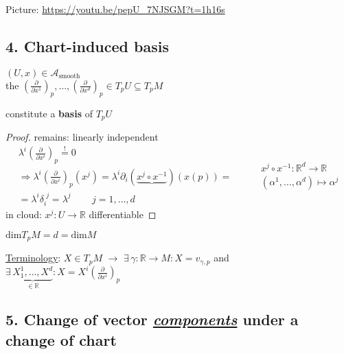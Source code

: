 Picture: \url{https://youtu.be/pepU_7NJSGM?t=1h16s}

\subsection{4. Chart-induced basis}

\begin{definition}
  $(U,x) \in \mathcal{A}_{\text{smooth}}$ \\
the $\left( \frac{ \partial }{ \partial x^1} \right)_p , \dots , \left( \frac{ \partial }{ \partial x^d} \right)_p \in T_pU \subseteq T_pM$

constitute a \textbf{basis} of $T_pU$

\end{definition}

\begin{proof} remains: linearly independent 
  \[
\begin{gathered}
\lambda^i \left( \frac{ \partial }{ \partial x^i} \right)_p \overset{!}{=} 0  \\
 \Longrightarrow \lambda^i \left( \frac{ \partial }{ \partial x^i} \right)_p(x^j) = \lambda^i \partial_i (\underbrace{ x^j \circ x^{-1} }_{} )( x(p)) = \\
 = \lambda^i \delta_i^{\,\,j} = \lambda^j \quad \quad \, j = 1 , \dots , d
\end{gathered} \quad \quad \, \begin{gathered}
  x^j \circ x^{-1} : \mathbb{R}^d \to \mathbb{R} \\
  (\alpha^1 , \dots , \alpha^d) \mapsto \alpha^j 
\end{gathered}
\]
in cloud: $x^j : U \to \mathbb{R}$ differentiable




\end{proof}


\begin{corollary}
 $ \text{dim}T_pM = d = \text{dim}M$
\end{corollary}

\underline{Terminology}: $X \in T_pM$ $\to $ $\exists \, \gamma : \mathbb{R} \to M : X = v_{\gamma,p}$ and \\
 $\exists \, \underbrace{ X_1^1 , \dots , X^d }_{\in \mathbb{R} } : X = X^i \left( \frac{ \partial }{ \partial x^i} \right)_p$



\subsection{5. Change of vector \emph{\underline{components}} under a change of chart}


